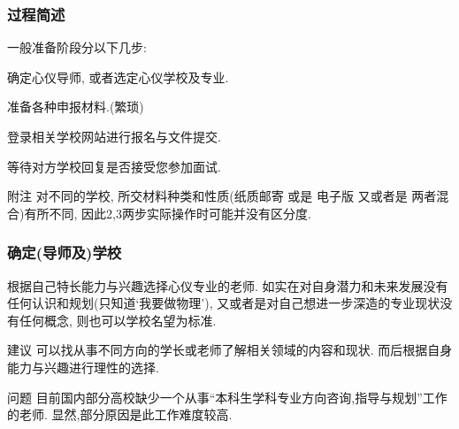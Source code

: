 \documentclass[Blue,dvipsnames]{beamer}
\begin{document}
    \begin{frame}
    \frametitle{过程简述}

    一般准备阶段分以下几步:

    \begin{description}[leftmargin=!,labelwidth=\widthof{\bfseries 确定(导师及)学校}]
      \small
      \item[确定(导师及)学校] 确定心仪导师, 或者选定心仪学校及专业.
      \item[准备材料]        准备各种申报材料.(繁琐)
      \item[提交申请]        登录相关学校网站进行报名与文件提交. 
      \item[等待回复]        等待对方学校回复是否接受您参加面试.
    \end{description}

    \begin{block}{附注}
      对不同的学校, 所交材料种类和性质(纸质邮寄 或是 电子版 又或者是 两者混合)有所不同, 因此2,3两步实际操作时可能并没有区分度. 
    \end{block}
    \end{frame}

    \begin{frame}
      \frametitle{确定(导师及)学校}
        根据自己特长能力与兴趣选择心仪专业的老师. 如实在对自身潜力和未来发展没有任何认识和规划(只知道`我要做物理'), 又或者是对自己想进一步深造的专业现状没有任何概念, 则也可以学校名望为标准.

        \begin{block}{建议}
          可以找从事不同方向的学长或老师了解相关领域的内容和现状. 而后根据自身能力与兴趣进行理性的选择.
        \end{block}

        \begin{alertblock}{问题}
          目前国内部分高校缺少一个从事``本科生学科专业方向咨询,指导与规划''工作的老师. 显然,部分原因是此工作难度较高.
        \end{alertblock}

      \end{frame}
\end{document}
